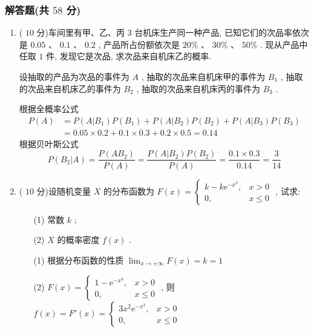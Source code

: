 \documentclass[cn,11pt,fancy,hide]{elegantbook}
\newcommand{\ee}{\mathrm{e}}
\renewcommand{\leq}{\leqslant}
\begin{document}
\subsubsection{解答题(共 $58$ 分)}
\begin{enumerate}
	\item ( $10$ 分)车间里有甲、乙、丙 $3$ 台机床生产同一种产品, 已知它们的次品率依次是 $0.05$ 、 $0.1$ 、 $0.2$ , 产品所占份额依次是 $20\%$ 、 $30\%$ 、 $50\%$ . 现从产品中任取 $1$ 件, 发现它是次品, 求次品来自机床乙的概率.
	\begin{solution}
		设抽取的产品为次品的事件为 $A$ , 抽取的次品来自机床甲的事件为 $B_1$ , 抽取的次品来自机床乙的事件为 $B_2$ , 抽取的次品来自机床丙的事件为 $B_3$ .
		
		根据全概率公式
		\begin{equation*}
			\begin{aligned}
			P(A)&=P(A|B_1)P(B_1)+P(A|B_2)P(B_2)+P(A|B_3)P(B_3)\\
			&=0.05\times0.2+0.1\times0.3+0.2\times0.5=0.14
			\end{aligned}
		\end{equation*}
		根据贝叶斯公式
		\begin{equation*}
			P(B_2|A)=\frac{P(AB_2)}{P(A)}=\frac{P(A|B_2)P(B_2)}{P(A)}=\frac{0.1\times0.3}{0.14}=\frac{3}{14}
		\end{equation*}
	\end{solution}
	
	\item ( $10$ 分)设随机变量 $X$ 的分布函数为 $F(x)=
	\begin{cases}
	k-k\ee^{-x^3}, & x>0\\
	0, & x\leq0
	\end{cases}
	$ , 试求:
	\begin{enumerate}
		\item[(1)] 常数 $k$ ;
		\item[(2)] $X$ 的概率密度 $f(x)$ .
	\end{enumerate}
    \begin{solution}
	  \begin{enumerate}
		\item[(1)] 根据分布函数的性质 $\lim_{x\to+\infty}F(x)=k=1$
		\item[(2)] $F(x)=
		\begin{cases}
		1-\ee^{-x^3}, & x>0\\
		0, & x\leq0 
		\end{cases}
		$ , 则$f(x)=F'(x)=
		\begin{cases}
		3x^2\ee^{-x^3}, & x>0\\
		0, & x\leq0
		\end{cases}
		$
	  \end{enumerate}
    \end{solution}


\end{enumerate}
\end{document}
